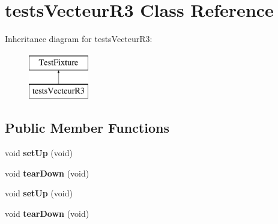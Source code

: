 \hypertarget{classtests_vecteur_r3}{}\section{tests\+Vecteur\+R3 Class Reference}
\label{classtests_vecteur_r3}
Inheritance diagram for tests\+Vecteur\+R3\+:\begin{figure}[H]
\begin{center}
\leavevmode
\includegraphics[height=2.000000cm]{classtests_vecteur_r3}
\end{center}
\end{figure}
\subsection*{Public Member Functions}
\begin{DoxyCompactItemize}
\item 
\mbox{\label{classtests_vecteur_r3_aab2c7d1043c9f9d55b55dfc273e0d932}} 
void {\bfseries set\+Up} (void)
\item 
\mbox{\label{classtests_vecteur_r3_ac6f02917ca38304b46fe4660295bf3cc}} 
void {\bfseries tear\+Down} (void)
\item 
\mbox{\label{classtests_vecteur_r3_aab2c7d1043c9f9d55b55dfc273e0d932}} 
void {\bfseries set\+Up} (void)
\item 
\mbox{\label{classtests_vecteur_r3_ac6f02917ca38304b46fe4660295bf3cc}} 
void {\bfseries tear\+Down} (void)
\end{DoxyCompactItemize}
